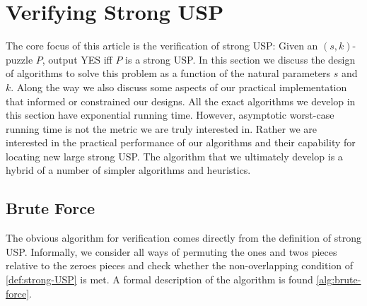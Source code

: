 \documentclass[11pt]{article}
\begin{document}
\section{Verifying Strong USP}
\label{sec:verify}

The core focus of this article is the verification of strong USP:
Given an $(s,k)$-puzzle $P$, output YES iff $P$ is a strong USP.  In
this section we discuss the design of algorithms to solve this problem
as a function of the natural parameters $s$ and $k$.
Along the way we also discuss some aspects of our practical
implementation that informed or constrained our designs.  All the
exact algorithms we develop in this section have exponential running
time.  However, asymptotic worst-case running time is not the metric
we are truly interested in.  Rather we are interested in the practical
performance of our algorithms and their capability for locating new
large strong USP.  The algorithm that we ultimately develop is a
hybrid of a number of simpler algorithms and heuristics.



\subsection{Brute Force}

The obvious algorithm for verification comes directly from the
definition of strong USP.  Informally, we consider all ways of
permuting the ones and twos pieces relative to the zeroes pieces and
check whether the non-overlapping condition of
\autoref{def:strong-USP} is met.  A formal description of the
algorithm is found \autoref{alg:brute-force}.
\end{document}
